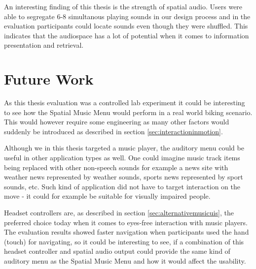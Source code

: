 An interesting finding of this thesis is the strength of spatial audio. Users were able to segregate 6-8 simultanous playing sounds in our design process and in the evaluation participants could locate sounds even though they were shuffled. This indicates that the audiospace has a lot of potential when it comes to information presentation and retrieval.


\section{Future Work}
As this thesis evaluation was a controlled lab experiment it could be interesting to see how the Spatial Music Menu would perform in a real world biking scenario. This would however require some engineering as many other factors would suddenly be introduced as described in section \ref{sec:interactioninmotion}.

Although we in this thesis targeted a music player, the auditory menu could be useful in other application types as well. One could imagine music track items being replaced with other non-speech sounds for example a news site with weather news represented by weather sounds, sports news represented by sport sounds, etc. Such kind of application did not have to target interaction on the move - it could for example be suitable for visually impaired people.

Headset controllers are, as described in section \ref{sec:alternativemusicuis}, the preferred choice today when it comes to eyes-free interaction with music players. The evaluation results showed faster navigation when participants used the hand (touch) for navigating, so it could be interesting to see, if a combination of this headset controller and spatial audio output could provide the same kind of auditory menu as the Spatial Music Menu and how it would affect the usability.











